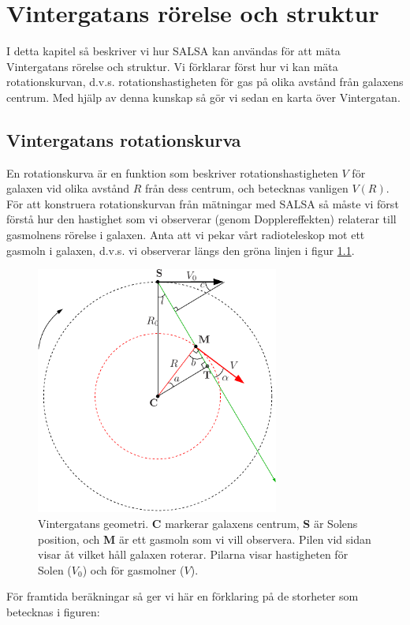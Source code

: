 \chapter{Vintergatans rörelse och struktur}
I detta kapitel så beskriver vi hur SALSA kan användas för att mäta Vintergatans
rörelse och struktur. Vi förklarar först hur vi kan mäta rotationskurvan, d.v.s.
rotationshastigheten för gas på olika avstånd från galaxens centrum.
Med hjälp av denna kunskap så gör vi sedan en karta över Vintergatan. 

\section{Vintergatans rotationskurva}
En rotationskurva är en funktion som beskriver rotationshastigheten $V$ för
galaxen vid olika avstånd $R$ från dess centrum, och betecknas vanligen $V(R)$. 
För att konstruera rotationskurvan från mätningar med SALSA så måste vi först
förstå hur den hastighet som vi observerar (genom Dopplereffekten) relaterar till
gasmolnens rörelse i galaxen. Anta att vi pekar vårt radioteleskop mot ett
gasmoln i galaxen, d.v.s. vi observerar längs den gröna linjen i figur \ref{fig:galgeom}.
\begin{figure}[ht]
\begin{center}
\includegraphics[width=8cm]{../figures/galgeom.pdf}
\end{center}
\caption{Vintergatans geometri. {\bf C} markerar galaxens centrum, {\bf S} är Solens position, 
	och {\bf M} är ett gasmoln som vi vill observera. Pilen vid sidan visar åt vilket håll
	galaxen roterar. Pilarna visar hastigheten för Solen ($V_0$) och för gasmolner ($V$).}
\label{fig:galgeom}
\end{figure}  
För framtida beräkningar så ger vi här en förklaring på de storheter som betecknas i figuren:
